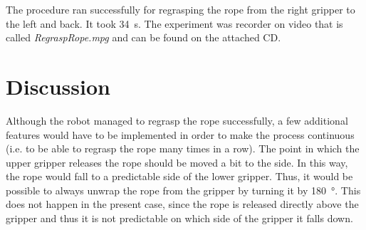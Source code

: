         The procedure ran successfully for regrasping the rope from the right gripper to the left and back. It took \SI{34}{s}. The experiment was recorder on video that is called \textit{RegraspRope.mpg} and can be found on the attached CD.

    \section{Discussion}
        Although the robot managed to regrasp the rope successfully, a few additional features would have to be implemented in order to make the process continuous (i.e. to be able to regrasp the rope many times in a row). The point in which the upper gripper releases the rope should be moved a bit to the side. In this way, the rope would fall to a predictable side of the lower gripper. Thus, it would be possible to always unwrap the rope from the gripper by turning it by \SI{180}{\degree}. This does not happen in the present case, since the rope is released directly above the gripper and thus it is not predictable on which side of the gripper it falls down. 